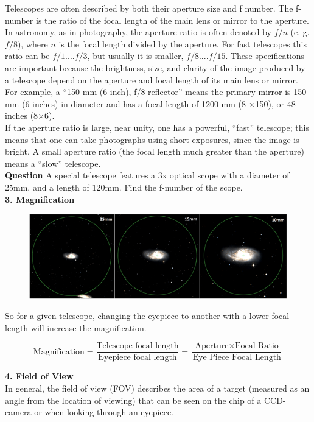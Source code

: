 \documentclass[a4paper,12pt]{extarticle}
\begin{document}
Telescopes are often described by both their aperture size and f number. The f-number is the ratio of the focal length of the main lens or mirror to the aperture. In astronomy, as in photography, the aperture ratio is often denoted by $f/n$ (e. g. $f/8$), where $n$ is the focal length divided by the aperture. For fast telescopes this ratio can be $f/1. . . . f/3$, but usually it is smaller, $f/8. . . . f/15$. These specifications are important because the brightness, size, and clarity of the image produced by a telescope depend on the aperture and focal length of its main lens or mirror. For example, a “150-mm (6-inch), f/8 reflector” means the primary mirror is 150 mm (6 inches) in diameter and has a focal length of 1200 mm (8 $\times$150), or 48 inches (8$\times$6).\\

If the aperture ratio is large, near unity, one has a powerful, ``fast'' telescope; this means that one can take photographs using short exposures, since the image is bright. A small aperture ratio (the focal length much greater than the aperture) means a ``slow'' telescope.\\

\textsf{\textbf{Question}} A special telescope features a 3x optical scope  with a diameter of 25mm, and a length of 120mm. Find the f-number of the scope.\\

\textbf{3. Magnification}\\
\begin{figure}[H]
	\centering
	\includegraphics[width=0.8\linewidth]{tel_magnify.png}
\end{figure}
So for a given telescope, changing the eyepiece to another with a lower focal length will increase the magnification.
\begin{defi}
	\[\text{Magnification}=\frac{\text{Telescope focal length}}{\text{Eyepiece focal length}}=\frac{\text{Aperture}\times \text{Focal Ratio}}{\text{Eye Piece Focal Length}}\]
\end{defi} 
\textbf{4. Field of View}\\

In general, the field of view (FOV) describes the area of a target (measured as an angle from the location of viewing) that can be seen on the chip of a CCD-camera or when looking through an eyepiece.\\
\end{document}
